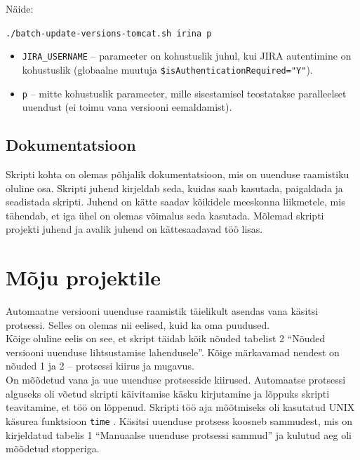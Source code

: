 \documentclass[12pt]{report}
\newcommand{\code}[1]{\texttt{#1}}
\begin{document}
  Näide:
  \begin{center}
    \small{\code{./batch-update-versions-tomcat.sh irina p}}
  \end{center}
  
  \begin{itemize}
    \item \code{JIRA\_USERNAME} \--- parameeter on kohustuslik juhul, kui JIRA autentimine on kohustuslik (globaalne muutuja \code{\$isAuthenticationRequired="Y"}).
    \item \code{p} \--- mitte kohustuslik parameeter, mille sisestamisel teostatakse paralleelset uuendust (ei toimu vana versiooni eemaldamist).
  \end{itemize}

  \subsection{Dokumentatsioon}
  
  Skripti kohta on olemas põhjalik dokumentatsioon, mis on uuenduse raamistiku oluline osa. Skripti juhend kirjeldab seda, kuidas saab kasutada, paigaldada ja seadistada skripti. Juhend on kätte saadav kõikidele meeskonna liikmetele, mis tähendab, et iga ühel on olemas võimalus seda kasutada. Mõlemad skripti projekti juhend ja avalik juhend on kättesaadavad töö lisas.
  
  \newpage
  
  \section{Mõju projektile}
  
  Automaatne versiooni uuenduse raamistik täielikult asendas vana käsitsi protsessi. Selles on olemas nii eelised, kuid ka oma puudused.\\
  
  Kõige oluline eelis on see, et skript täidab kõik nõuded tabelist 2 ``Nõuded versiooni uuenduse lihtsustamise lahendusele''. Kõige märkavamad nendest on nõuded 1 ja 2 \--- protsessi kiirus ja mugavus.\\
  
  On mõõdetud vana ja uue uuenduse protsesside kiirused. Automaatse protsessi alguseks oli võetud skripti käivitamise käsku kirjutamine ja lõppuks skripti teavitamine, et töö on lõppenud. Skripti töö aja mõõtmiseks oli kasutatud UNIX käsurea funktsioon \code{time} \cite{time}. Käsitsi uuenduse protsess koosneb sammudest, mis on kirjeldatud tabelis 1 ``Manuaalse uuenduse protsessi sammud'' ja kulutud aeg oli mõõdetud stopperiga.\\
  
\end{document}
